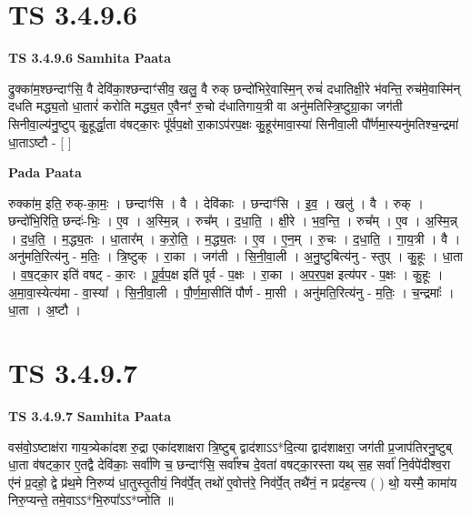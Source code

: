 \documentclass[17pt]{extarticle}
\begin{document}

\section{ TS 3.4.9.6 }

\textbf{TS 3.4.9.6 } \newline
\textbf{Samhita Paata} \newline

द्रुक्का॑म॒श्छन्दाꣳ॑सि॒ वै देवि॑का॒श्छन्दाꣳ॑सीव॒ खलु॒ वै रुक् छन्दो॑भिरे॒वास्मि॒न् रुचं॑ दधातिक्षी॒रे भ॑वन्ति॒ रुच॑मे॒वास्मि॑न् दधति मद्ध्य॒तो धा॒तारं॑ करोति मद्ध्य॒त ए॒वैनꣳ॑ रु॒चो द॑धातिगाय॒त्री वा अनु॑मतिस्त्रि॒ष्टुग्रा॒का जग॑ती सिनीवा॒ल्य॑नु॒ष्टुप् कु॒हूर्द्धा॒ता व॑षट्का॒रः पू᳚र्वप॒क्षो रा॒काऽप॑रप॒क्षः कु॒हूर॑मावा॒स्या॑ सिनीवा॒ली पौ᳚र्णमा॒स्यनु॑मतिश्च॒न्द्रमा॑ धा॒ताऽष्टौ - [  ] \newline

\textbf{Pada Paata} \newline

रुक्का॑म॒ इति॒ रुक्-का॒मः॒ । छन्दाꣳ॑सि । वै । देवि॑काः । छन्दाꣳ॑सि । इ॒व॒ । खलु॑ । वै । रुक् । छन्दो॑भि॒रिति॒ छन्दः॑-भिः॒ । ए॒व । अ॒स्मि॒न्न् । रुच᳚म् । द॒धा॒ति॒ । क्षी॒रे । भ॒व॒न्ति॒ । रुच᳚म् । ए॒व । अ॒स्मि॒न्न् । द॒ध॒ति॒ । म॒द्ध्य॒तः । धा॒तार᳚म् । क॒रो॒ति॒ । म॒द्ध्य॒तः । ए॒व । ए॒न॒म् । रु॒चः । द॒धा॒ति॒ । गा॒य॒त्री । वै । अनु॑मति॒रित्य॑नु - म॒तिः॒ । त्रि॒ष्टुक् । रा॒का । जग॑ती । सि॒नी॒वा॒ली । अ॒नु॒ष्टुबित्य॑नु - स्तुप् । कु॒हूः । धा॒ता । व॒ष॒ट्का॒र इति॑ वषट् - का॒रः । पू॒र्व॒प॒क्ष इति॑ पूर्व - प॒क्षः । रा॒का । अ॒प॒र॒प॒क्ष इत्य॑पर - प॒क्षः । कु॒हूः । अ॒मा॒वा॒स्येत्य॑मा - वा॒स्या᳚ । सि॒नी॒वा॒ली । पौ॒र्ण॒मा॒सीति॑ पौर्ण - मा॒सी । अनु॑मति॒रित्य॑नु - म॒तिः॒ । च॒न्द्रमाः᳚ । धा॒ता । अ॒ष्टौ ।  \newline





\section{ TS 3.4.9.7 }

\textbf{TS 3.4.9.7 } \newline
\textbf{Samhita Paata} \newline

वस॑वो॒ऽष्टाक्ष॑रा गाय॒त्र्येका॑दश रु॒द्रा एका॑दशाक्षरा त्रि॒ष्टुब् द्वाद॑शाऽऽ*दि॒त्या द्वाद॑शाक्षरा॒ जग॑ती प्र॒जाप॑तिरनु॒ष्टुब् धा॒ता व॑षट्का॒र ए॒तद्वै देवि॑काः॒ सर्वा॑णि च॒ छन्दाꣳ॑सि॒ सर्वा᳚श्च दे॒वता॑ वषट्का॒रस्ता यथ् स॒ह सर्वा॑ नि॒र्वपे॑दीश्व॒रा ए॑नं प्र॒दहो॒ द्वे प्र॑थ॒मे नि॒रुप्य॑ धा॒तुस्तृ॒तीयं॒ निव॑र्पे॒त् तथो॑ ए॒वोत्त॑रे॒ निव॑र्पे॒त् तथै॑नं॒ न प्रद॑ह॒न्त्य ( ) थो॒ यस्मै॒ कामा॑य निरु॒प्यन्ते॒ तमे॒वाऽऽ*भि॒रुपा᳚ऽऽ*प्नोति ॥ \newline
\end{document}
